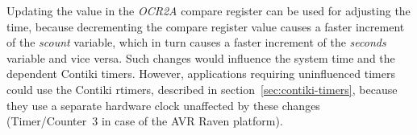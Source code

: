 Updating the value in the {\it{OCR2A}} compare register
can be used for adjusting the time, because decrementing the compare register
value causes a faster increment of the {\it{scount}} variable, which in turn causes
a faster increment of the {\it{seconds}} variable and vice versa.
Such changes would influence the system time and the dependent Contiki timers.
However, applications requiring uninfluenced timers
could use the Contiki rtimers, described in section~\ref{sec:contiki-timers},
because they use a separate hardware clock unaffected by these changes
(Timer/Counter~3 in case of the AVR Raven platform).
